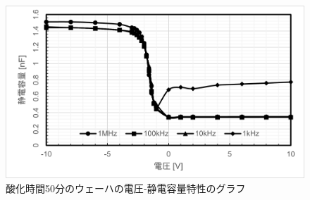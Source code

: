 \documentclass[11pt]{jarticle}
\begin{document}
			\begin{figure}[H]
			\centering
			\includegraphics[width = 12cm]{figs/wehacap50.png}
			\caption{酸化時間50分のウェーハの電圧‐静電容量特性のグラフ}
			\label{fig:wehacap50}
			\end{figure}
\end{document}
